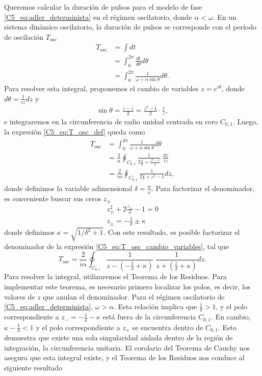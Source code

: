 {Queremos calcular la duración de pulsos para el modelo de fase \ref{C5_eq:adler_determinista} en el régimen oscilatorio, donde $\alpha < \omega$. En un sistema dinámico oscilatorio, la duración de pulsos se corresponde con el período de oscilación $T_{\text{osc}}$ 
\begin{align}
    T_{\text{osc}}&= \int dt \\ 
    &= \int_{0}^{2 \pi} \frac{dt}{d\theta} d\theta \\
    &= \int_{0}^{2 \pi} \frac{1}{\omega + \alpha \sin{\theta}} d\theta.
    \label{C5_eq:T_osc_def}
\end{align}
Para resolver esta integral, proponemos el cambio de variables $z = e^{i \theta}$, donde $d\theta = \frac{1}{iz} dz$ y
\begin{align}
    \sin{\theta} = \frac{z - \overline{z}}{2}
                  = \frac{z^{2} - 1}{2} \cdot \frac{1}{z},
\end{align}
e integraremos en la circunferencia de radio unidad centrada en cero $C_{0,1}$. Luego, la expresión \ref{C5_eq:T_osc_def} queda como
\begin{align}
    T_{\text{osc}}&= \int_{0}^{2 \pi} \frac{1}{\omega + \alpha \sin{\theta}} d\theta \nonumber \\
    &= \frac{2}{\alpha} \oint_{C_{0,1}} \frac{1}{2 \frac{\omega}{\alpha} + \frac{z^{2} - 1}{z}} \; \frac{dz}{iz} \nonumber\\
    &= \frac{2}{i \alpha} \oint_{C_{0,1}} \frac{1}{2 \frac{z}{\delta} + z^{2}-1}dz,
    \label{C5_eq:T_osc_cambio_variables}
\end{align}
 donde definimos la variable adimensional $\delta = \frac{\alpha}{\omega}$. Para factorizar el denominador, es conveniente buscar sus ceros $z_\pm$
\begin{align}
    z_\pm^{2} + 2 \frac{z_\pm}{\delta} - 1=0 \nonumber\\
    z_\pm = -\frac{1}{\delta}  \pm \kappa
\end{align}
donde definimos $\kappa = \sqrt{1/\delta^{2} + 1}$. Con este resultado, es posible factorizar el denominador de la expresión \ref{C5_eq:T_osc_cambio_variables}, tal que 
\begin{equation}
    T_{\text{osc}}= \frac{2}{i \alpha} \oint_{C_{0,1}} \frac{1}{z-( -\frac{1}{\delta} + \kappa)} \; \frac{1}{z + (\frac{1}{\delta} + \kappa)} dz.
    \label{C5_eq:T_osc_factorizada}
\end{equation}
Para resolver la integral, utilizaremos el Teorema de los Residuos. Para implementar este teorema, es necesario primero localizar los polos, es decir, los valores de $z$ que anulan el denominador. Para el régimen oscilatorio de \ref{C5_eq:adler_determinista}, $\omega > \alpha $. Esta relación implica que $\frac{1}{\delta} >1$, y el polo correspondiente a $z_- = -\frac{1}{\delta}  - \kappa $ está fuera de la circunferencia $C_{0,1}$. En cambio, $\kappa - \frac{1}{\delta} < 1 $ y el polo correspondiente a $z_+$ se encuentra dentro de $C_{0,1}$. Esto demuestra que existe una sola singularidad aislada dentro de la región de integración, la circunferencia unitaria. El corolario del Teorema de Cauchy nos asegura que esta integral existe, y el Teorema de los Residuos nos conduce al siguiente resultado \cite{Strogatz1994}

}
